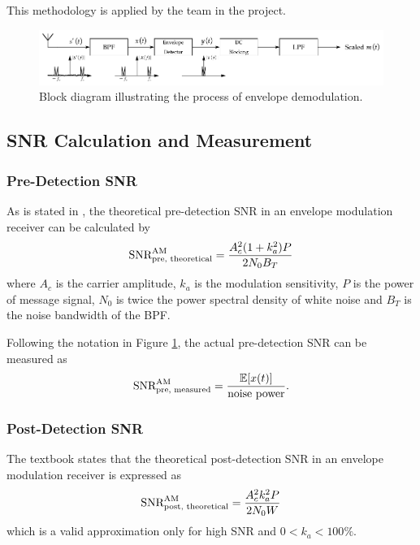 \documentclass[../ECE459FinalProjectReport.tex]{subfiles}
\begin{document}
This methodology is applied by the team in the project.

\begin{figure}[htb]
    \centering
    \includegraphics[width=\linewidth]{plots/env-demod.pdf}
    \caption{Block diagram illustrating the process of envelope demodulation.}
    \label{fig:env-demod}
\end{figure}

\subsection{SNR Calculation and Measurement}
\subsubsection{Pre-Detection SNR}
As is stated in \textcite[Eq. (9.26)]{haykinIntroductionAnalogDigital2007}, the theoretical pre-detection SNR in an envelope modulation receiver can be calculated by
\begin{equation}
  \text{SNR}_{\text{pre, theoretical}}^{\text{AM}} = \frac{A_c^2 (1+k_a^2)P}{2N_0 B_T}
\end{equation}
where $A_c$ is the carrier amplitude, $k_a$ is the modulation sensitivity, $P$ is the power of message signal, $N_0$ is twice the power spectral density of white noise and $B_T$ is the noise bandwidth of the BPF.

Following the notation in Figure \ref{fig:env-demod}, the actual pre-detection SNR can be measured as
\begin{equation}
    \text{SNR}_{\text{pre, measured}}^{\text{AM}} = \frac{\mathbb{E}[x(t)]}{\text{noise power}}.
\end{equation}


\subsubsection{Post-Detection SNR}

The textbook \cite[Eq. (9.23)]{haykinIntroductionAnalogDigital2007} states that the theoretical post-detection SNR in an envelope modulation receiver is expressed as
\begin{equation}
    \text{SNR}_{\text{post, theoretical}}^{\text{AM}} = \frac{A_c^2 k_a^2 P}{2N_0 W}
\end{equation}
which is a valid approximation only for high SNR and $0<k_a<100\%$.
\end{document}
